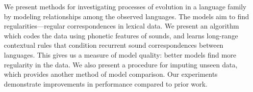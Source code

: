 We present methods for investigating processes of evolution in a language family by modeling relationships among the observed languages. The models aim to find regularities---regular correspondences in lexical data.  We present an algorithm which codes the data using phonetic features of sounds, and learns long-range contextual rules that condition recurrent sound correspondences between languages.  This gives us a measure of model quality: better models find more regularity in the data. We also present a procedure for imputing unseen data, which provides another method of model comparison.  Our experiments demonstrate improvements in performance compared to prior work.
